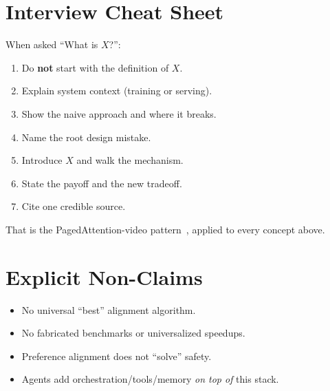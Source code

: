 \documentclass[11pt,a4paper]{article}
\begin{document}
\section{Interview Cheat Sheet}
\label{sec:cheat}

When asked ``What is \(X\)?'':
\begin{enumerate}[leftmargin=*]
  \item Do \textbf{not} start with the definition of \(X\).
  \item Explain system context (training or serving).
  \item Show the naive approach and where it breaks.
  \item Name the root design mistake.
  \item Introduce \(X\) and walk the mechanism.
  \item State the payoff and the new tradeoff.
  \item Cite one credible source.
\end{enumerate}
That is the PagedAttention-video pattern~\cite{vizuara2026paged}, applied to every concept above.

\section{Explicit Non-Claims}
\label{sec:nonclaims}

\begin{itemize}[leftmargin=*]
  \item No universal ``best'' alignment algorithm.
  \item No fabricated benchmarks or universalized speedups.
  \item Preference alignment does not ``solve'' safety.
  \item Agents add orchestration/tools/memory \emph{on top of} this stack.
\end{itemize}
\end{document}
